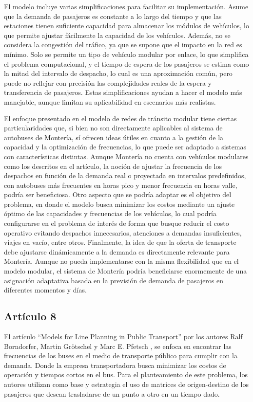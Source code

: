 \documentclass[preprint,11pt]{elsarticle}
\begin{document}
El modelo incluye varias simplificaciones para facilitar su implementación. Asume que la demanda de pasajeros es constante a lo largo del tiempo y que las estaciones tienen suficiente capacidad para almacenar los módulos de vehículos, lo que permite ajustar fácilmente la capacidad de los vehículos. Además, no se considera la congestión del tráfico, ya que se supone que el impacto en la red es mínimo. Solo se permite un tipo de vehículo modular por enlace, lo que simplifica el problema computacional, y el tiempo de espera de los pasajeros se estima como la mitad del intervalo de despacho, lo cual es una aproximación común, pero puede no reflejar con precisión las complejidades reales de la espera y transferencia de pasajeros. Estas simplificaciones ayudan a hacer el modelo más manejable, aunque limitan su aplicabilidad en escenarios más realistas.

El enfoque presentado en el modelo de redes de tránsito modular tiene ciertas particularidades que, si bien no son directamente aplicables al sistema de autobuses de Montería, sí ofrecen ideas útiles en cuanto a la gestión de la capacidad y la optimización de frecuencias, lo que puede ser adaptado a sistemas con características distintas. Aunque Montería no cuenta con vehículos modulares como los descritos en el artículo, la noción de ajustar la frecuencia de los despachos en función de la demanda real o proyectada en intervalos predefinidos, con autobuses más frecuentes en horas pico y menor frecuencia en horas valle, podría ser beneficiosa. Otro aspecto que se podría adaptar es el objetivo del problema, en donde el modelo busca minimizar los costos mediante un ajuste óptimo de las capacidades y frecuencias de los vehículos, lo cual podría configurarse en el problema de interés de forma que busque reducir el costo operativo evitando despachos innecesarios, atenciones a demandas insuficientes, viajes en vacío, entre otros. Finalmente, la idea de que la oferta de transporte debe ajustarse dinámicamente a la demanda es directamente relevante para Montería. Aunque no pueda implementarse con la misma flexibilidad que en el modelo modular, el sistema de Montería podría beneficiarse enormemente de una asignación adaptativa basada en la previsión de demanda de pasajeros en diferentes momentos y días.

\subsection*{Artículo 8}


El artículo “Models for Line Planning in Public Transport” por los autores Ralf Borndorfer, Martin Grötschel y Marc E. Pfetsch \cite{borndorfer2005}, se enfoca en encontrar las frecuencias de los buses en el medio de transporte público para cumplir con la demanda. Donde la empresa transportadora busca minimizar los costos de operación y tiempos cortos en el bus. Para el planteamiento de este problema, los autores utilizan como base y estrategia el uso de matrices de origen-destino de los pasajeros que desean trasladarse de un punto a otro en un tiempo dado.
\end{document}
